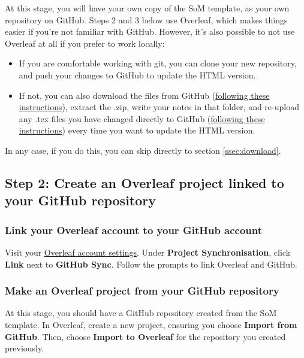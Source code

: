 At this stage, you will have your own copy of the SoM template, as your own repository on GitHub. Steps 2 and 3 below use Overleaf, which makes things easier if you're not familiar with GitHub. However, it's also possible to not use Overleaf at all if you prefer to work locally:

\begin{itemize}
    \item If you are comfortable working with git, you can clone your new repository, and push your changes to GitHub to update the HTML version.
    \item If not, you can also download the files from GitHub (\href{https://docs.github.com/en/get-started/start-your-journey/downloading-files-from-github#downloading-a-repositorys-files}{following these instructions}), extract the .zip, write your notes in that folder, and re-upload any .tex files you have changed directly to GitHub (\href{https://docs.github.com/en/get-started/start-your-journey/uploading-a-project-to-github#step-2-upload-files-to-your-projects-repository}{following these instructions}) every time you want to update the HTML version.
\end{itemize}

In any case, if you do this, you can skip directly to section \ref{ssec:download}.


\subsection{Step 2: Create an Overleaf project linked to your GitHub repository}
\label{ssec:overleaf}

\subsubsection{Link your Overleaf account to your GitHub account}

Visit your \href{https://www.overleaf.com/user/settings}{Overleaf account settings}. Under \textbf{Project Synchronisation}, click \textbf{Link} next to \textbf{GitHub Sync}. Follow the prompts to link Overleaf and GitHub.

\subsubsection{Make an Overleaf project from your GitHub repository}

At this stage, you should have a GitHub repository created from the SoM template. In Overleaf, create a new project, ensuring you choose \textbf{Import from GitHub}. Then, choose \textbf{Import to Overleaf} for the repository you created previously.

